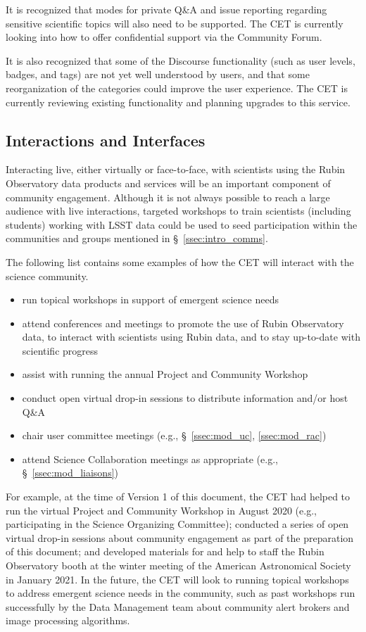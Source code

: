 \documentclass[DM,lsstdraft,toc]{lsstdoc}
\begin{document}
It is recognized that modes for private Q\&A and issue reporting regarding sensitive scientific topics will also need to be supported.
The CET is currently looking into how to offer confidential support via the Community Forum.

It is also recognized that some of the Discourse functionality (such as user levels, badges, and tags) are not yet well understood by users, and that some reorganization of the categories could improve the user experience.
The CET is currently reviewing existing functionality and planning upgrades to this service.


\subsection{Interactions and Interfaces}\label{ssec:mod_interface}

Interacting live, either virtually or face-to-face, with scientists using the Rubin Observatory data products and services will be an important component of community engagement.
Although it is not always possible to reach a large audience with live interactions, targeted workshops to train scientists (including students) working with LSST data could be used to seed participation within the communities and groups mentioned in \S~\ref{ssec:intro_comms}.

The following list contains some examples of how the CET will interact with the science community.
\begin{itemize}
\item run topical workshops in support of emergent science needs
\item attend conferences and meetings to promote the use of Rubin Observatory data, to interact with scientists using Rubin data, and to stay up-to-date with scientific progress
\item assist with running the annual Project and Community Workshop
\item conduct open virtual drop-in sessions to distribute information and/or host Q\&A 
\item chair user committee meetings (e.g., \S~\ref{ssec:mod_uc}, \ref{ssec:mod_rac})
\item attend Science Collaboration meetings as appropriate (e.g., \S~\ref{ssec:mod_liaisons})
\end{itemize}

For example, at the time of Version 1 of this document, the CET had helped to run the virtual Project and Community Workshop in August 2020 (e.g., participating in the Science Organizing Committee); conducted a series of open virtual drop-in sessions about community engagement as part of the preparation of this document; and developed materials for and help to staff the Rubin Observatory booth at the winter meeting of the American Astronomical Society in January 2021. 
In the future, the CET will look to running topical workshops to address emergent science needs in the community, such as past workshops run successfully by the Data Management team about community alert brokers and image processing algorithms. 
\end{document}
